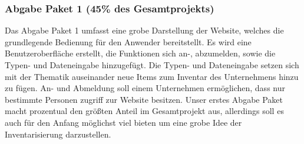 \documentclass[11pt,a4paper]{report}
\begin{document}
\subsubsection{Abgabe Paket 1 (45\% des Gesamtprojekts)}
Das Abgabe Paket 1 umfasst eine grobe Darstellung der Website, welches die grundlegende Bedienung für den Anwender bereitstellt.
Es wird eine Benutzeroberfläche erstellt, die Funktionen sich an-, abzumelden, sowie die Typen- und Dateneingabe hinzugefügt.
Die Typen- und Dateneingabe setzen sich mit der Thematik auseinander neue Items zum Inventar des Unternehmens hinzu zu fügen.
An- und Abmeldung soll einem Unternehmen ermöglichen, dass nur bestimmte Personen zugriff zur Website besitzen.
Unser erstes Abgabe Paket macht prozentual den größten Anteil im Gesamtprojekt aus, allerdings soll es auch für den Anfang möglichst viel bieten um eine grobe Idee der Inventarisierung darzustellen.
\end{document}
